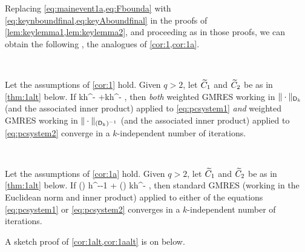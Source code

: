 Replacing \cref{eq:mainevent1a,eq:Fbounda} with \cref{eq:keynboundfinal,eq:keyAboundfinal} in the proofs of \cref{lem:keylemma1,lem:keylemma2}, and proceeding as in those proofs, we can obtain the following , the analogues of \cref{cor:1,cor:1a}.

\label{cor:1alt}

\

\noindent Let the assumptions of \cref{cor:1} hold.  Given $q >2$, let $\widetilde{C}_{1}$ and $\widetilde{C}_{2}$ be as in \cref{thm:1alt} below. If 
\beq\label{eq:condalt}
\Cotilde kh^{-} \NLqDop{\Aso-\Ast} +\Cttilde  kh^{-} \NLqDRR{\nso-\nst},
\leq {}
\eeq
then \emph{both} weighted GMRES working in $\|\cdot\|_{\mathsf{D}_k}$ (and the associated inner product) applied to \cref{eq:pcsystem1} \emph{and} weighted GMRES working in $\|\cdot\|_{(\mathsf{D}_k)^{-1}}$ (and the associated inner product) applied to \cref{eq:pcsystem2}  converge in a $k$-independent number of iterations.
\enth

\label{cor:1aalt}

\

\noindent Let the assumptions of \cref{cor:1a} hold.  Given $q >2$, let $\widetilde{C}_{1}$ and $\widetilde{C}_{2}$ be as in \cref{thm:1alt} below. If 
\beq\label{eq:condaalt}
\Cotilde \mleft(\frac{\splus}{\mminus}\mright) h^{--1} \NLqDop{\Aso-\Ast} + \Cttilde \mleft(\frac{\mplus}{\mminus}\mright) kh^{-} \NLqDRR{\nso-\nst} \leq \half,
\eeq
then standard GMRES (working in the Euclidean norm and inner product) applied to either of the equations \cref{eq:pcsystem1} or \cref{eq:pcsystem2}
 converges in a $k$-independent number of iterations.
 \enth

 A sketch proof of \cref{cor:1alt,cor:1aalt} is on  below.

